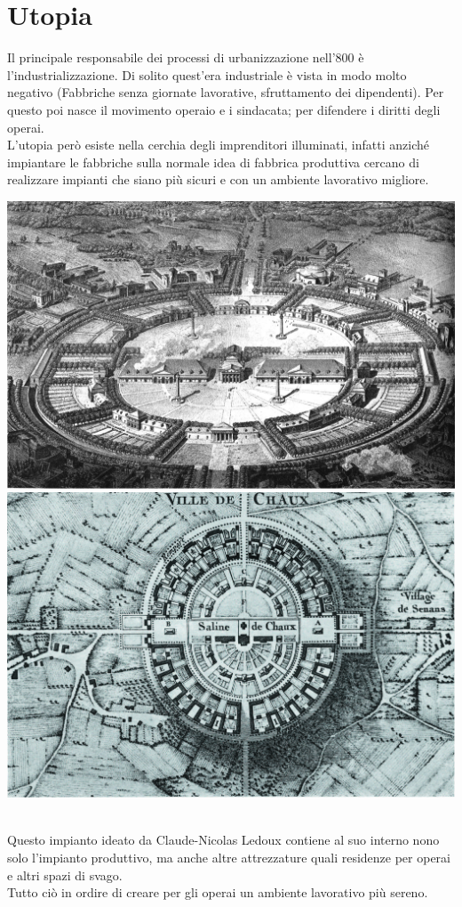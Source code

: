 \documentclass[a4paper,12pt, oneside]{book}
\begin{document}
\section{Utopia}
Il principale responsabile dei processi di urbanizzazione nell'800 è l'industrializzazione. Di solito quest'era industriale è vista in modo molto negativo (Fabbriche senza giornate lavorative, sfruttamento dei dipendenti). Per questo poi nasce il movimento operaio e i sindacata; per difendere i diritti degli operai.\\
L'utopia però esiste nella cerchia degli imprenditori illuminati, infatti anziché impiantare le fabbriche sulla normale idea di fabbrica produttiva cercano di realizzare impianti che siano più sicuri e con un ambiente lavorativo migliore.
\leavevmode\\
 \begin{center}
   \includegraphics[width=0.6\linewidth]{"immagini/Salina de Chaux"}
\\
   \includegraphics[width=0.6\linewidth]{"immagini/Salina de Chaux top"}
 \end{center}
\leavevmode\\
Questo impianto ideato da Claude-Nicolas Ledoux contiene al suo interno nono solo l'impianto produttivo, ma anche altre attrezzature quali residenze per operai e altri spazi di svago.\\
Tutto ciò in ordire di creare per gli operai un ambiente lavorativo più sereno.\\
\end{document}
